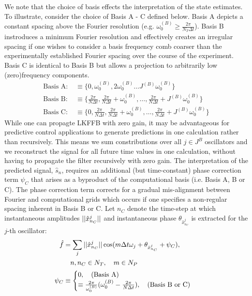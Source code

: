 We note that the choice of basis effects the interpretation of the state estimates. To illustrate, consider the choice of Basis A - C defined below. Basis A depicts a constant spacing above the Fourier resolution (e.g. $\omega_0^{(B)} \geq \frac{2\pi}{N_T \Delta t}$). Basis B  instroduces a minimum Fourier resolution and effectively creates an irregular spacing if one wishes to consider a basis frequency comb coarser than the experimentally established Fourier spacing over the course of the experiment. Basis C is identical to Basis B but allows a projection to arbitrarily low (zero)frequency components. 
\begin{align}
\text{Basis A: } & \equiv \{0, \omega_0^{(B)}, 2\omega_0^{(B)} \dots  J^{(B)} \omega_0^{(B)} \} \\
\text{Basis B: } & \equiv \{ \frac{2\pi}{N \Delta t}, \frac{2\pi}{N \Delta t} + \omega_0^{(B)} , \dots,   \frac{2\pi}{N \Delta t} + J^{(B)} \omega_0^{(B)} \} \\
\text{Basis C: } & \equiv \{ 0, \frac{2\pi}{N \Delta t}, \frac{2\pi}{N \Delta t} + \omega_0^{(B)},  \dots,   \frac{2\pi}{N \Delta t} + J^{(B)} \omega_0^{(B)} \} 
\end{align}
 While one can propagte LKFFB with zero gain, it may be advantageous for predictive control applications to generate predictions in one calculation rather than recursively. This means we sum constributions over all $j\in J^B$ oscillators and we reconstruct the signal for all future time values in one calculation, without having to propagate the filter recursively with zero gain. The interpretation of the predicted signal, $\hat{s}_n$, requires an additional (but time-constant) phase correction term $\psi_C$ that arises as a byproduct of the computational basis (i.e. Basis A, B or C).  The phase correction term corrects for a gradual mis-alignment between Fourier and computational grids which occurs if one specifies a non-regular spacing inherent in Basis B or C. Let $n_C$ denote the time-step at which instantaneous amplitudes $||\hat{x}^j_{n_C}||$ and instantaneous phase $\theta_{\hat{x}^j_{n_C}}$ is extracted for the $j$-th oscillator:
\begin{align}
\hat{f} &= \sum_j||\hat{x}^j_{n_C}|| \cos(m\Delta t \omega_j + \theta_{\hat{x}^j_{n_C}} + \psi_C), \\
& \quad  n, n_C \in N_T, \quad m \in N_P \nonumber \\
\psi_C & \equiv \begin{cases}
0,  \quad \text{(Basis A)} \\
\equiv  \frac{2\pi}{\omega_0^{(B)} } (\omega_0^{(B)} - \frac{2\pi}{N \Delta t}), \quad \text{(Basis B or C)} \\
\end{cases}
\end{align}

